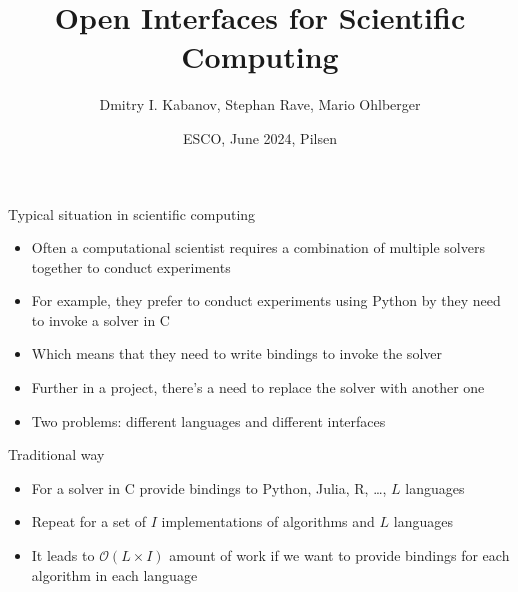 \documentclass[10pt, aspectratio=169, progressbar=frametitle]{beamer}
\title{Open Interfaces for Scientific Computing}
\author{Dmitry I. Kabanov, Stephan Rave, Mario Ohlberger}
\institute{Institute for Analysis and Numerics, University of Münster}
\date{{\large ESCO, June 2024, Pilsen}}
\begin{document}
\maketitle

\begin{frame}{Typical situation in scientific computing}
  \begin{itemize}
    \item Often a computational scientist requires
          a combination of multiple solvers together to conduct experiments
    \item For example, they prefer to conduct experiments using Python
          by they need to invoke a solver in C
    \item Which means that they need to write bindings to invoke the solver
    \item Further in a project, there's a need to replace the solver with
          another one
    \item \alert{Two problems:} different languages and different interfaces
  \end{itemize}
\end{frame}

\begin{frame}{Traditional way}
  \begin{minipage}{0.45\textwidth}
    \begin{itemize}
      \item For a solver in C provide bindings to Python, Julia, R, \dots, $L$ languages
      \item Repeat for a set of $I$ implementations of algorithms and $L$ languages
      \item It leads to $\mathcal O(L \times I)$ amount of work if we want to provide
            bindings for each algorithm in each language
    \end{itemize}
  \end{minipage}\hfill
  \begin{minipage}{0.45\textwidth}
    
  \end{minipage}
\end{frame}
\end{document}
